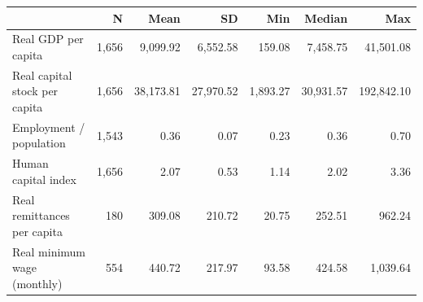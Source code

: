 \begin{tabular}{l*{6}{r}}
\toprule
                    &           N&        Mean&          SD&         Min&      Median&         Max\\
\midrule
Real GDP per capita &       1,656&    9,099.92&    6,552.58&      159.08&    7,458.75&   41,501.08\\
Real capital stock per capita&       1,656&   38,173.81&   27,970.52&    1,893.27&   30,931.57&  192,842.10\\
Employment / population&       1,543&        0.36&        0.07&        0.23&        0.36&        0.70\\
Human capital index &       1,656&        2.07&        0.53&        1.14&        2.02&        3.36\\
Real remittances per capita&         180&      309.08&      210.72&       20.75&      252.51&      962.24\\
Real minimum wage (monthly)&         554&      440.72&      217.97&       93.58&      424.58&    1,039.64\\
\bottomrule
\end{tabular}
